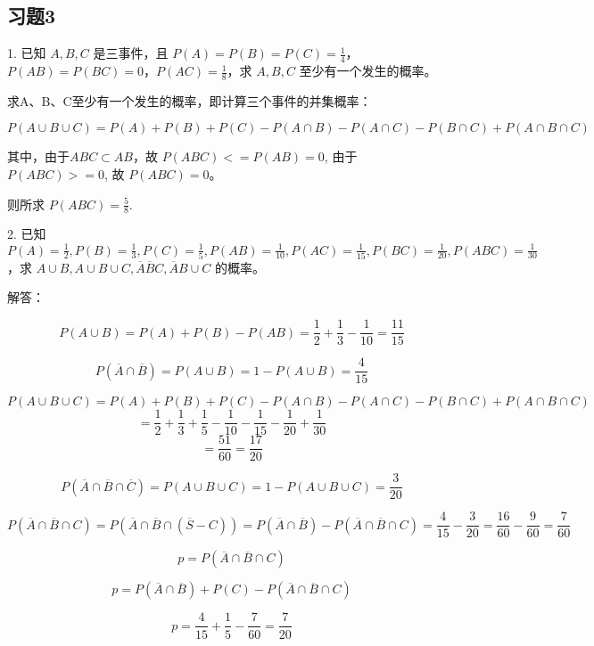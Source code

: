 \documentclass[twoside]{article}
\begin{document}
\subsection{习题3}

1. 已知 \( A, B, C \) 是三事件，且 \( P(A) = P(B) = P(C) = \frac{1}{4} \)，\( P(AB) = P(BC) = 0 \)，\( P(AC) = \frac{1}{8} \)，求 \( A, B, C \) 至少有一个发生的概率。

求A、B、C至少有一个发生的概率，即计算三个事件的并集概率：

\begin{ans}{5}{5}

\[
P(A \cup B \cup C) = P(A) + P(B) + P(C) - P(A \cap B) - P(A \cap C) - P(B \cap C) + P(A \cap B \cap C)
\]

其中，由于$ ABC \subset AB$，故 $ P(ABC) <= P(AB) = 0 $, 由于 $ P(ABC) >= 0 $, 故 $ P(ABC) = 0$。

则所求 $ P(ABC) = \frac{5}{8 }$.

\end{ans}

2. 已知 \( P(A) = \frac{1}{2}, P(B) = \frac{1}{3}, P(C) = \frac{1}{5}, P(AB) = \frac{1}{10}, P(AC) = \frac{1}{15}, P(BC) = \frac{1}{20}, P(ABC) = \frac{1}{30} \)，求 \( A \cup B, A \cup B \cup C, \overline{A} \overline{B} C, \overline{A} B \cup C \) 的概率。

\begin{ans}{6}{6}

解答：

\[
P(A \cup B) = P(A) + P(B) - P(AB) = \frac{1}{2} + \frac{1}{3} - \frac{1}{10} = \frac{11}{15}
\]

\[
P(\overline{A} \cap \overline{B}) = P(A \cup B) = 1 - P(A \cup B) = \frac{4}{15}
\]

\[
P(A \cup B \cup C) = P(A) + P(B) + P(C) - P(A \cap B) - P(A \cap C) - P(B \cap C) + P(A \cap B \cap C)
\]
\[
= \frac{1}{2} + \frac{1}{3} + \frac{1}{5} - \frac{1}{10} - \frac{1}{15} - \frac{1}{20} + \frac{1}{30}
\]
\[
= \frac{51}{60} = \frac{17}{20}
\]


\[
P(\overline{A} \cap \overline{B} \cap \overline{C}) = P(A \cup B \cup C) = 1 - P(A \cup B \cup C) = \frac{3}{20}
\]

\[
P(\overline{A} \cap \overline{B} \cap C) = P(\overline{A} \cap \overline{B} \cap (\overline{S} - C)) = P(\overline{A} \cap \overline{B}) - P(\overline{A} \cap \overline{B} \cap C)
= \frac{4}{15} - \frac{3}{20} = \frac{16}{60} - \frac{9}{60} = \frac{7}{60}
\]

\[
p = P(\overline{A} \cap \overline{B} \cap C)
\]

\[
p = P(\overline{A} \cap \overline{B}) + P(C) - P(\overline{A} \cap \overline{B} \cap C)
\]

\[
p = \frac{4}{15} + \frac{1}{5} - \frac{7}{60} = \frac{7}{20}
\]

\end{ans}
\end{document}
